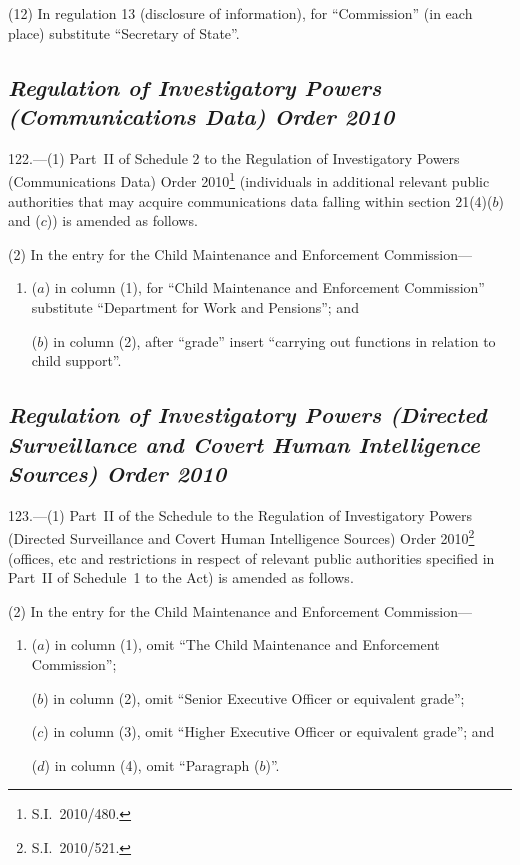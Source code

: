 \documentclass[12pt,a4paper]{article}
\begin{document}
(12) In regulation 13 (disclosure of information), for “Commission” (in each place) substitute “Secretary of State”.

\subsection*{\itshape
Regulation of Investigatory Powers (Communications Data) Order 2010
}

122.---(1)  Part~II of Schedule 2 to the Regulation of Investigatory Powers (Communications Data) Order 2010\footnote{S.I.~2010/480.} (individuals in additional relevant public authorities that may acquire communications data falling within section 21(4)($b$)  and ($c$)) is amended as follows.

(2) In the entry for the Child Maintenance and Enforcement Commission—
\begin{enumerate}\item[]
($a$) in column (1), for “Child Maintenance and Enforcement Commission” substitute “Department for Work and Pensions”; and

($b$) in column (2), after “grade” insert “carrying out functions in relation to child support”.
\end{enumerate}

\subsection*{\itshape
Regulation of Investigatory Powers (Directed Surveillance and Covert Human Intelligence Sources) Order 2010
}

123.---(1)  Part~II of the Schedule to the Regulation of Investigatory Powers (Directed Surveillance and Covert Human Intelligence Sources) Order 2010\footnote{S.I.~2010/521.} (offices, etc and restrictions in respect of relevant public authorities specified in Part~II of Schedule~1 to the Act) is amended as follows.

(2) In the entry for the Child Maintenance and Enforcement Commission—
\begin{enumerate}\item[]
($a$) in column (1), omit “The Child Maintenance and Enforcement Commission”;

($b$) in column (2), omit “Senior Executive Officer or equivalent grade”;

($c$) in column (3), omit “Higher Executive Officer or equivalent grade”; and

($d$) in column (4), omit “Paragraph ($b$)”.
\end{enumerate}
\end{document}
